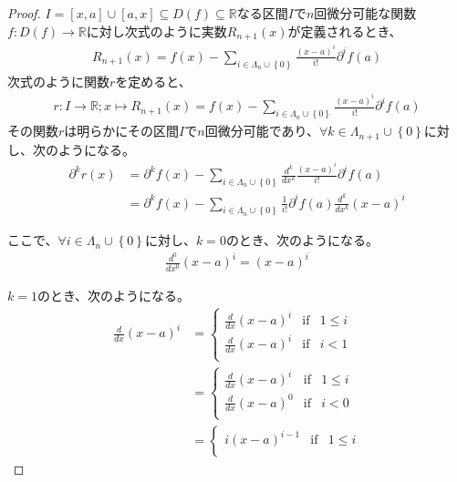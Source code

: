 \documentclass[dvipdfmx]{jsarticle}
\begin{document}
\begin{proof}
$I = [ x,a] \cup [ a,x] \subseteq D(f) \subseteq \mathbb{R}$なる区間$I$で$n$回微分可能な関数$f:D(f) \rightarrow \mathbb{R}$に対し次式のように実数$R_{n + 1}(x)$が定義されるとき、
\begin{align*}
R_{n + 1}(x) = f(x) - \sum_{i \in \varLambda_{n} \cup \left\{ 0 \right\}} {\frac{(x - a)^{i}}{i!}\partial^{i}f(a)}
\end{align*}
次式のように関数$r$を定めると、
\begin{align*}
r:I \rightarrow \mathbb{R};x \mapsto R_{n + 1}(x) = f(x) - \sum_{i \in \varLambda_{n} \cup \left\{ 0 \right\}} {\frac{(x - a)^{i}}{i!}\partial^{i}f(a)}
\end{align*}
その関数$r$は明らかにその区間$I$で$n$回微分可能であり、$\forall k \in \varLambda_{n + 1} \cup \left\{ 0 \right\}$に対し、次のようになる。
\begin{align*}
\partial^{k}r(x) &= \partial^{k}f(x) - \sum_{i \in \varLambda_{n} \cup \left\{ 0 \right\}} {\frac{d^{k}}{dx^{k}}\frac{(x - a)^{i}}{i!}\partial^{i}f(a)}\\
&= \partial^{k}f(x) - \sum_{i \in \varLambda_{n} \cup \left\{ 0 \right\}} {\frac{1}{i!}\partial^{i}f(a)\frac{d^{k}}{dx^{k}}(x - a)^{i}}
\end{align*}\par
ここで、$\forall i \in \varLambda_{n} \cup \left\{ 0 \right\}$に対し、$k = 0$のとき、次のようになる。
\begin{align*}
\frac{d^{0}}{dx^{0}}(x - a)^{i} = (x - a)^{i}
\end{align*}\par
$k = 1$のとき、次のようになる。
\begin{align*}
\frac{d}{dx}(x - a)^{i} &= \left\{ \begin{matrix}
\frac{d}{dx}(x - a)^{i} & \mathrm{if} & 1 \leq i \\
\frac{d}{dx}(x - a)^{i} & \mathrm{if} & i < 1 \\
\end{matrix} \right.\ \\
&= \left\{ \begin{matrix}
\frac{d}{dx}(x - a)^{i} & \mathrm{if} & 1 \leq i \\
\frac{d}{dx}(x - a)^{0} & \mathrm{if} & i < 0 \\
\end{matrix} \right.\ \\
&= \left\{ \begin{matrix}
i(x - a)^{i - 1} & \mathrm{if} & 1 \leq i \\

\end{matrix}
\end{align*}
\end{proof}
\end{document}
